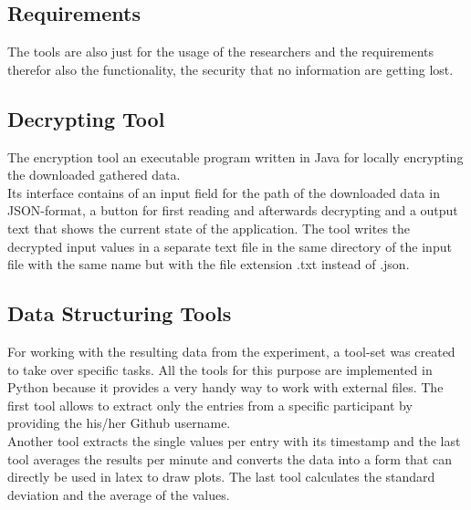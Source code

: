 \subsection{Requirements}
The tools are also just for the usage of the researchers and the requirements therefor also the functionality, the security that no information are getting lost.

\subsection{Decrypting Tool}
The encryption tool an executable program written in Java for locally encrypting the downloaded gathered data.\\
Its interface contains of an input field for the path of the downloaded data in JSON-format, a button for first reading and afterwards decrypting and a output text that shows the current state of the application. The tool writes the decrypted input values in a separate text file in the same directory of the input file with the same name but with the file extension .txt instead of .json. 

\subsection{Data Structuring Tools}
For working with the resulting data from the experiment, a tool-set was created to take over specific tasks. All the tools for this purpose are implemented in Python because it provides a very handy way to work with external files. 
The first tool allows to extract only the entries from a specific participant by providing the his/her Github username.\\
Another tool extracts the single values per entry with its timestamp and the last tool averages the results per minute and converts the data into a form that can directly be used in latex to draw plots.
The last tool calculates the standard deviation and the average of the values. 

